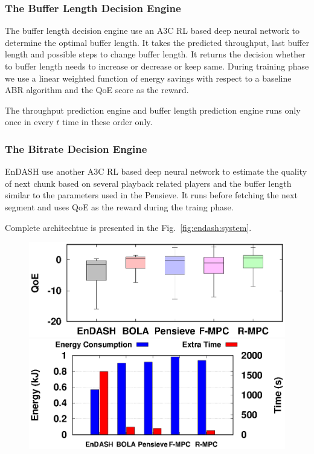 \subsubsection{The Buffer Length Decision Engine}
The buffer length decision engine use an A3C RL based deep neural network to
determine the optimal buffer length. It takes the predicted throughput, last buffer length and possible steps to change buffer length. It returns the decision whether to buffer length needs to increase or decrease or keep same. During training phase we use a linear weighted function of energy savings with respect to a baseline ABR algorithm and the QoE score as the reward.

The throughput prediction engine and buffer length prediction engine runs only once in every $t$ time in these order only.
\subsubsection{The Bitrate Decision Engine}
EnDASH use another A3C RL based deep neural network to estimate the quality of next chunk based on several playback related players and the buffer length similar to the parameters used in the Pensieve\cite{mao2017neural}. It runs before fetching the next segment and uses QoE as the reward during the traing phase.

Complete architechtue is presented in the Fig.~\ref{fig:endash:system}.

\begin{figure}[!h]
	\begin{minipage}[t]{0.48\linewidth}
		\includegraphics[width=\linewidth]{img/EnDASH/QoE}
		\caption{\label{fig:endash:qoe}}
	\end{minipage}\hfill
	\begin{minipage}[t]{0.48\linewidth}
		\includegraphics[width=\linewidth]{img/EnDASH/EnergyConsumption}
		\caption{\label{fig:endash:energy}}
	\end{minipage}
\end{figure}
